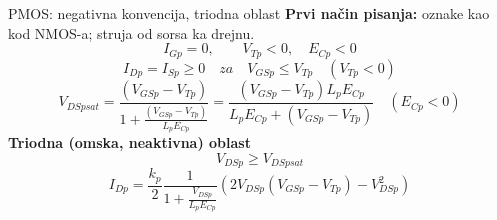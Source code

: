\begin{frame}[label=09_2-s012]{PMOS: negativna konvencija, triodna oblast}
\textbf{Prvi način pisanja:} oznake kao kod NMOS-a; struja od sorsa ka drejnu.
\[I_{Gp}=0,\qquad V_{Tp}<0,\quad E_{Cp}<0\]
\[I_{Dp}=I_{Sp}\ge0\quad\textit{za}\quad V_{GSp}\le V_{Tp}\quad(V_{Tp}<0)\]
\[V_{DSpsat}=\frac{(V_{GSp}-V_{Tp})}{1+\frac{(V_{GSp}-V_{Tp})}{L_pE_{Cp}}}=\frac{(V_{GSp}-V_{Tp})L_pE_{Cp}}{L_pE_{Cp}+(V_{GSp}-V_{Tp})}\quad(E_{Cp}<0)\]
\textbf{Triodna (omska, neaktivna) oblast}\[V_{DSp}\ge V_{DSpsat}\]
\[I_{Dp}=\frac{k_p}2\frac1{1+\frac{V_{DSp}}{L_pE_{Cp}}}\left(2V_{DSp}(V_{GSp}-V_{Tp})-V_{DSp}^2\right)\]

\end{frame}
